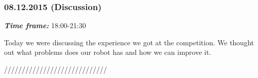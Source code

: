 \subsubsection{08.12.2015 (Discussion)}
\textit{\textbf{Time frame:}} 18:00-21:30

Today we were discussing the experience we got at the competition.
We thought out what problems does our robot has and how we can improve it.

/////////////////////////////
